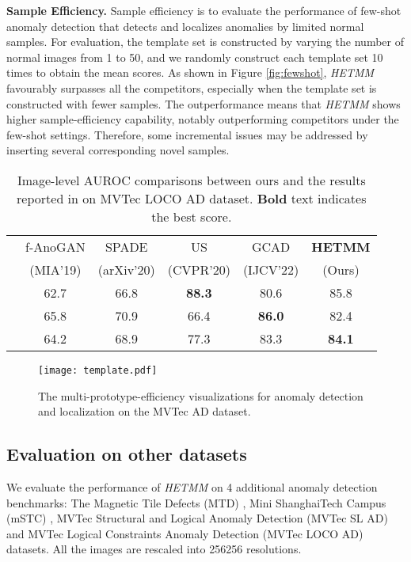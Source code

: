 \documentclass[default,iicol]{sn-jnl}\usepackage[algo2e,ruled,linesnumbered]{algorithm2e}
\theoremstyle{thmstyleone}\newtheorem{theorem}{Theorem}\newtheorem{proposition}[theorem]{Proposition}
\theoremstyle{thmstyletwo}\newtheorem{example}{Example}\newtheorem{remark}{Remark}
\theoremstyle{thmstylethree}\newtheorem{definition}{Definition}
\begin{document}
\noindent\textbf{Sample Efficiency. }
Sample efficiency is to evaluate the performance of few-shot anomaly detection that detects and localizes anomalies by limited normal samples.
For evaluation, the template set is constructed by varying the number of normal images from 1 to 50, and we randomly construct each template set 10 times to obtain the mean scores.
As shown in Figure \ref{fig:fewshot}, \textit{HETMM} favourably surpasses all the competitors, especially when the template set is constructed with fewer samples.
The outperformance means that \textit{HETMM} shows higher sample-efficiency capability, notably outperforming competitors under the few-shot settings.
Therefore, some incremental issues may be addressed by inserting several corresponding novel samples.


\begin{table}[!t]
    \caption{
    Image-level AUROC comparisons between ours and the results reported in \cite{MVTECLOCO} on MVTec LOCO AD dataset.
    \textbf{Bold} text indicates the best score.
    }
    \tiny
    \centering
    \setlength{\tabcolsep}{0.7mm}
    \begin{tabular}{c|ccccc}
        \hline
        \multirow{2}{*}{} &f-AnoGAN\cite{F-AnoGan} &SPADE\cite{SPADE}  &US\cite{US}   &GCAD\cite{MVTECLOCO}  &\textbf{HETMM}  \\
                                    &(MIA'19)                &(arXiv'20)         &(CVPR'20)     &(IJCV'22)        &(Ours)\\\hline
                         &62.7                   &66.8              &\textbf{88.3}         &80.6            &85.8  \\
                         &65.8                   &70.9              &66.4         &\textbf{86.0}             &82.4  \\\hline
                                &64.2                   &68.9              &77.3         &83.3            &\textbf{84.1}  \\\hline
    \end{tabular}
    \label{table:MVTECLOCO}
\end{table}

\begin{figure*}[!t]
    \centering
    \texttt{[image: template.pdf]}
    \caption{
    The multi-prototype-efficiency visualizations for anomaly detection and localization on the MVTec AD dataset.
    }
    \label{fig:template}
\end{figure*}

\subsection{Evaluation on other datasets} \label{EXP:Others}
We evaluate the performance of \textit{HETMM} on 4 additional anomaly detection benchmarks: The Magnetic Tile Defects (MTD) \cite{MTD}, Mini ShanghaiTech Campus (mSTC) \cite{mSTC}, MVTec Structural and Logical Anomaly Detection (MVTec SL AD) \cite{MVTECLOCO} and MVTec Logical Constraints Anomaly Detection (MVTec LOCO AD) \cite{MVTECLOCO} datasets.
All the images are rescaled into 256256 resolutions.
\end{document}
